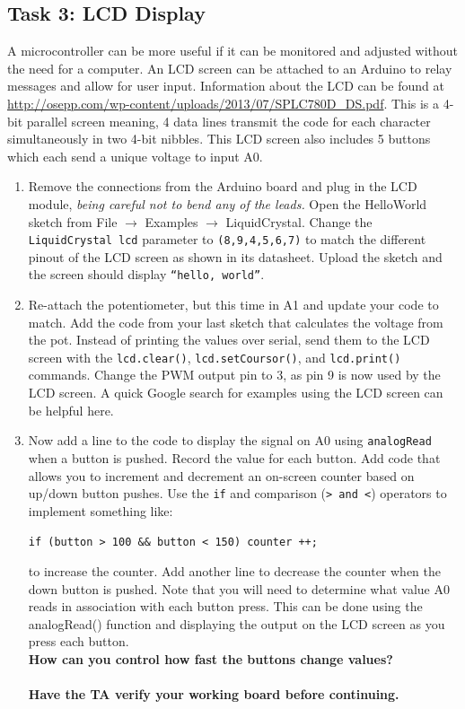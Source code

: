 \documentclass[12pt]{article}
\begin{document}
\subsection*{Task 3: LCD Display}
A microcontroller can be more useful if it can be monitored and adjusted without the need for a computer. 
An LCD screen can be attached to an Arduino to relay messages and allow for user input. 
Information about the LCD can be found at \url{http://osepp.com/wp-content/uploads/2013/07/SPLC780D_DS.pdf}.
This is a 4-bit parallel screen meaning, 
4 data lines transmit the code for each character simultaneously in two 4-bit nibbles. 
This LCD screen also includes 5 buttons which each send a unique voltage to input A0.

\begin{enumerate}
\item Remove the connections from the Arduino board and plug in the LCD module, {\it being careful not to bend any of the leads.} 
Open the HelloWorld sketch from File $\rightarrow$ Examples $\rightarrow$ LiquidCrystal. 
Change the \texttt{LiquidCrystal lcd} parameter to \texttt{(8,9,4,5,6,7)} to match the different pinout of the LCD screen as shown in its datasheet. 
Upload the sketch and the screen should display \texttt{``hello, world''}. 
\item Re-attach the potentiometer, but this time in A1 and update your code to match. 
Add the code from your last sketch that calculates the voltage from the pot. 
Instead of printing the values over serial, send them to the LCD screen with the \texttt{lcd.clear()}, 
\texttt{lcd.setCoursor()}, and \texttt{lcd.print()} commands. 
Change the PWM output pin to 3, as pin 9 is now used by the LCD screen. A quick Google search for examples using the LCD screen can be helpful here.
\item Now add a line to the code to display the signal on A0 using \texttt{analogRead} when a button is pushed. 
Record the value for each button. 
Add code that allows you to increment and decrement an on-screen counter based on up/down button pushes. 
Use the \texttt{if} and comparison (\texttt{> and <}) operators to implement something like:
\begin{center}
\texttt{if (button > 100 \&\& button < 150) counter ++;}\\
\end{center}
to increase the counter. 
Add another line to decrease the counter when the down button is pushed. Note that you will need to determine what value A0 reads in association with each button press.  This can be done using the analogRead() function and displaying the output on the LCD screen as you press each button.\\
{\bf How can you control how fast the buttons change values?}\\
\bigskip \bigskip \bigskip \\
{\bf Have the TA verify your working board before continuing.}\\
\bigskip \bigskip \bigskip
\end{enumerate}
\end{document}

